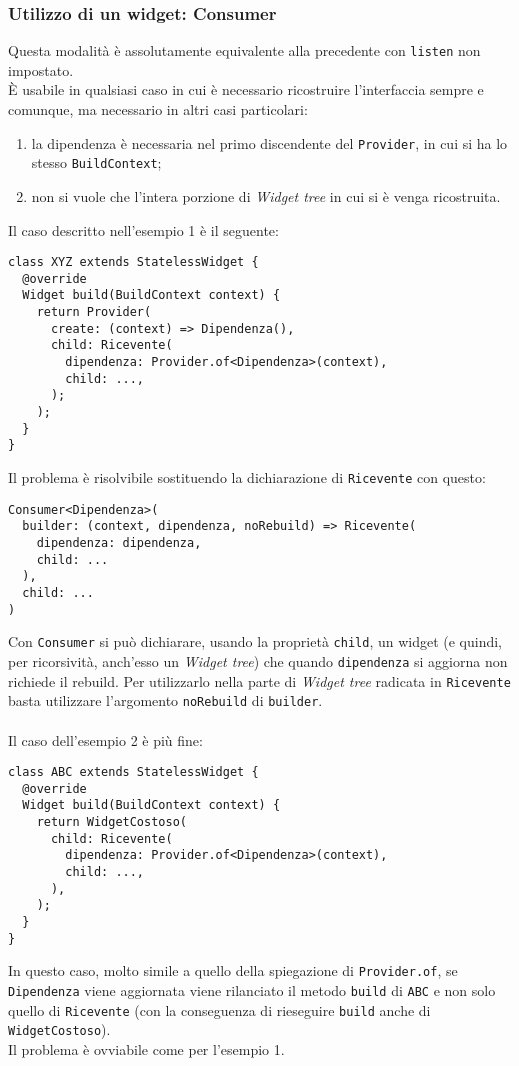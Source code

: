 \subsubsection{Utilizzo di un widget: Consumer}
\label{subsubsec:utilizzo-widget-consumer-flutter}

Questa modalità è assolutamente equivalente alla precedente con \texttt{listen} non impostato.\\
È usabile in qualsiasi caso in cui è necessario ricostruire l'interfaccia sempre e comunque, ma necessario in altri casi particolari:
\begin{enumerate}
    \item la dipendenza è necessaria nel primo discendente del \texttt{Provider}, in cui si ha lo stesso \texttt{BuildContext};
    \item non si vuole che l'intera porzione di \emph{Widget tree} in cui si è venga ricostruita.
\end{enumerate}
Il caso descritto nell'esempio 1 è il seguente:
\begin{lstlisting}
class XYZ extends StatelessWidget {
  @override
  Widget build(BuildContext context) {
    return Provider(
      create: (context) => Dipendenza(),
      child: Ricevente(
        dipendenza: Provider.of<Dipendenza>(context),
        child: ...,
      );
    );
  }
}
\end{lstlisting}
Il problema è risolvibile sostituendo la dichiarazione di \texttt{Ricevente} con questo:
\begin{lstlisting}
Consumer<Dipendenza>(
  builder: (context, dipendenza, noRebuild) => Ricevente(
    dipendenza: dipendenza,
    child: ...
  ),
  child: ...
)
\end{lstlisting}
Con \texttt{Consumer} si può dichiarare, usando la proprietà \texttt{child}, un widget (e quindi, per ricorsività, anch'esso un \emph{Widget tree}) che quando \texttt{dipendenza} si aggiorna non richiede il rebuild.
Per utilizzarlo nella parte di \emph{Widget tree} radicata in \texttt{Ricevente} basta utilizzare l'argomento \texttt{noRebuild} di \texttt{builder}.\\\\
Il caso dell'esempio 2 è più fine:
\begin{lstlisting}
class ABC extends StatelessWidget {
  @override
  Widget build(BuildContext context) {
    return WidgetCostoso(
      child: Ricevente(
        dipendenza: Provider.of<Dipendenza>(context),
        child: ...,
      ),
    );
  }
}
\end{lstlisting}
In questo caso, molto simile a quello della spiegazione di \texttt{Provider.of}, se \texttt{Dipendenza} viene aggiornata viene rilanciato il metodo \texttt{build} di \texttt{ABC} e non solo quello di \texttt{Ricevente} (con la conseguenza di rieseguire \texttt{build} anche di \texttt{WidgetCostoso}).\\
Il problema è ovviabile come per l'esempio 1.


